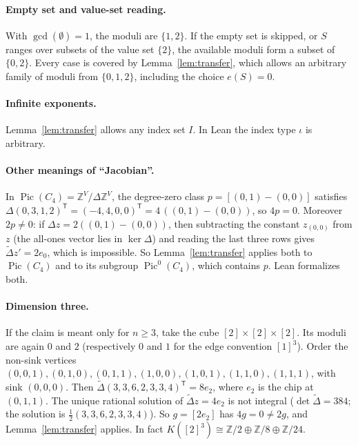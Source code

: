 \documentclass[11pt]{article}
\theoremstyle{definition}
\theoremstyle{remark}
\newcommand{\Z}{\mathbb{Z}}
\newcommand{\Pic}{\operatorname{Pic}}
\begin{document}
\paragraph{Empty set and value-set reading.} With $\gcd(\emptyset)=1$, the
moduli are $\{1,2\}$. If the empty set is skipped, or $S$ ranges over subsets
of the value set $\{2\}$, the available moduli form a subset of $\{0,2\}$.
Every case is covered by Lemma~\ref{lem:transfer}, which allows an arbitrary
family of moduli from $\{0,1,2\}$, including the choice $e(S)=0$.

\paragraph{Infinite exponents.} Lemma~\ref{lem:transfer} allows any index set $I$.
In Lean the index type $\iota$ is arbitrary.

\paragraph{Other meanings of ``Jacobian''.} In $\Pic(C_4)=\Z^V/\Delta\Z^V$, the
degree-zero class $p=[(0,1)-(0,0)]$ satisfies
$\Delta(0,3,1,2)^{\mathsf T}=(-4,4,0,0)^{\mathsf T}=4\,((0,1)-(0,0))$, so $4p=0$. Moreover
$2p\ne0$: if $\Delta z=2((0,1)-(0,0))$, then subtracting the constant $z_{(0,0)}$
from $z$ (the all-ones vector lies in $\ker\Delta$) and reading the last three
rows gives $\tilde\Delta z'=2e_0$, which is impossible. So
Lemma~\ref{lem:transfer} applies both to $\Pic(C_4)$ and to its subgroup
$\Pic^0(C_4)$, which contains $p$. Lean formalizes both.

\paragraph{Dimension three.} If the claim is meant only for $n\ge3$, take the
cube $[2]\times[2]\times[2]$. Its moduli are again $0$ and $2$ (respectively $0$ and $1$
for the edge convention $[1]^3$). Order the non-sink vertices
$(0,0,1),(0,1,0),(0,1,1),(1,0,0),(1,0,1),(1,1,0),(1,1,1)$, with sink $(0,0,0)$.
Then $\tilde\Delta(3,3,6,2,3,3,4)^{\mathsf T}=8e_2$, where $e_2$ is the chip at
$(0,1,1)$. The unique rational solution of $\tilde\Delta z=4e_2$ is not
integral ($\det\tilde\Delta=384$; the solution is $\frac12(3,3,6,2,3,3,4)$).
So $g=[2e_2]$ has $4g=0\ne2g$, and Lemma~\ref{lem:transfer} applies. In fact
$K([2]^3)\cong\Z/2\oplus\Z/8\oplus\Z/24$.
\end{document}
